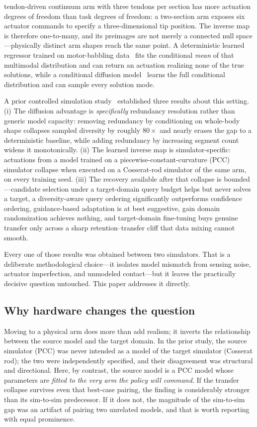 \documentclass[letterpaper, 10pt, conference]{ieeeconf}
\providecommand{\IEEEPARstart}[2]{\PARstart{#1}{#2}}
\begin{document}
\IEEEPARstart{A}{} tendon-driven continuum arm with three tendons per section
has more actuation degrees of freedom than task degrees of freedom: a
two-section arm exposes six actuator commands to specify a three-dimensional
tip position. The inverse map is therefore one-to-many, and its preimages are
not merely a connected null space---physically distinct arm shapes reach the
same point. A deterministic learned regressor trained on motor-babbling
data~\cite{giorelli2015neural} fits the conditional \emph{mean} of that
multimodal distribution and can return an actuation realizing none of the
true solutions, while a conditional diffusion
model~\cite{ho2020denoising,song2021denoising} learns the full conditional
distribution and can sample every solution mode.

A prior controlled simulation study~\cite{prior} established three results
about this setting. (i) The diffusion advantage is \emph{specifically}
redundancy resolution rather than generic model capacity: removing redundancy
by conditioning on whole-body shape collapses sampled diversity by roughly
$80\times$ and nearly erases the gap to a deterministic baseline, while
adding redundancy by increasing segment count widens it monotonically. (ii)
The learned inverse map is simulator-specific: actuations from a model
trained on a piecewise-constant-curvature (PCC) simulator collapse when
executed on a Cosserat-rod simulator of the same arm, on every training seed.
(iii) The recovery available after that collapse is bounded---candidate
selection under a target-domain query budget helps but never solves a target,
a diversity-aware query ordering significantly outperforms confidence
ordering, guidance-based adaptation is at best suggestive, gain domain
randomization achieves nothing, and target-domain fine-tuning buys genuine
transfer only across a sharp retention--transfer cliff that data mixing
cannot smooth.

Every one of those results was obtained between two simulators. That is a
deliberate methodological choice---it isolates model mismatch from
sensing noise, actuator imperfection, and unmodeled contact---but it leaves
the practically decisive question untouched. This paper addresses it
directly.

\subsection*{Why hardware changes the question}

Moving to a physical arm does more than add realism; it inverts the
relationship between the source model and the target domain. In the prior
study, the source simulator (PCC) was never intended as a model of the target
simulator (Cosserat rod); the two were independently specified, and their
disagreement was structural and directional. Here, by contrast, the source
model is a PCC model whose parameters are \emph{fitted to the very arm the
policy will command}. If the transfer collapse survives even that
best-case pairing, the finding is considerably stronger than its sim-to-sim
predecessor. If it does not, the magnitude of the sim-to-sim gap was an
artifact of pairing two unrelated models, and that is worth reporting with
equal prominence.
\end{document}
